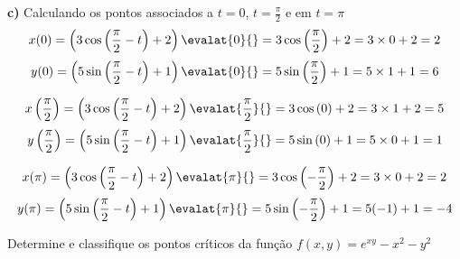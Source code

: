\documentclass[a4paper,12pt,fleqn]{article}
\begin{document}
\begin{answer}
\bigskip
\textbf{c)} \quad
Calculando os pontos associados a $t=0$, $t=\frac{\pi}{2}$ e em $t=\pi$
\[
  x(0)
  = \left(3 \cos\left(\frac{\pi}{2}-t\right) + 2\right)\evalat{0}{}
  = 3 \cos\left(\frac{\pi}{2}\right) + 2
  = 3 \times 0 + 2
  = 2
\]
\[
  y(0)
  = \left(5 \sin\left(\frac{\pi}{2}-t\right) + 1\right)\evalat{0}{}
  = 5 \sin\left(\frac{\pi}{2}\right) + 1
  = 5 \times 1 + 1
  = 6
\]

\medskip
\[
  x\left(\frac{\pi}{2}\right)
  = \left(3 \cos\left(\frac{\pi}{2}-t\right) + 2\right)\evalat{\frac{\pi}{2}}{}
  = 3 \cos\left(0\right) + 2
  = 3 \times 1 + 2
  = 5
\]
\[
  y\left(\frac{\pi}{2}\right)
  = \left(5 \sin\left(\frac{\pi}{2}-t\right) + 1\right)\evalat{\frac{\pi}{2}}{}
  = 5 \sin\left(0\right) + 1
  = 5 \times 0 + 1
  = 1
\]

\medskip
\[
  x(\pi)
  = \left(3 \cos\left(\frac{\pi}{2}-t\right) + 2\right)\evalat{\pi}{}
  = 3 \cos\left(-\frac{\pi}{2}\right) + 2
  = 3 \times 0 + 2
  = 2
\]
\[
  y(\pi)
  = \left(5 \sin\left(\frac{\pi}{2}-t\right) + 1\right)\evalat{\pi}{}
  = 5 \sin\left(-\frac{\pi}{2}\right) + 1
  = 5 (-1) + 1
  = -4
\]
\end{answer}

Determine e classifique os pontos críticos da função
\(
  f(x,y) = e^{xy} - x^2 - y^2
\)

\clearpagequestiononly
\end{document}
